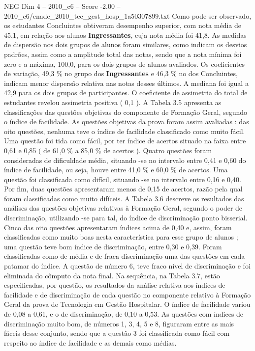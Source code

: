 \begin{textsample}{NEG Dim 4 – 2010\_c6 – Score -2.00 – 2010\_c6/enade\_2010\_tec\_gest\_hosp\_1a50307899.txt}
Como pode ser observado, os estudantes Concluintes obtiveram desempenho superior, com nota média de 45,1, em relação aos alunos \textbf{Ingressantes}, cuja nota média foi 41,8.
As medidas de dispersão nos dois grupos de alunos foram similares, como indicam os desvios padrões, assim como a amplitude total das notas, sendo que a nota mínima foi zero e a máxima, 100,0, para os dois grupos de alunos avaliados.
Os coeficientes de variação, 49,3 \% no grupo dos \textbf{Ingressantes} e 46,3 \% no dos Concluintes, indicam menor dispersão relativa nas notas desses últimos.
A mediana foi igual a 42,9 para os dois grupos de participantes.
O coeficiente de assimetria do total de estudantes revelou assimetria positiva ( 0,1 ).
A Tabela 3.5 apresenta as classificações das questões objetivas do componente de Formação Geral, segundo o índice de facilidade.
As questões objetivas da prova foram assim avaliadas : das oito questões, nenhuma teve o índice de facilidade classificado como muito fácil.
Uma questão foi tida como fácil, por ter índice de acertos situado na faixa entre 0,61 e 0,85 ( de 61,0 \% a 85,0 \% de acertos ).
Quatro questões foram consideradas de dificuldade média, situando -se no intervalo entre 0,41 e 0,60 do índice de facilidade, ou seja, houve entre 41,0 \% e 60,0 \% de acertos.
Uma questão foi classificada como difícil, situando -se no intervalo entre 0,16 e 0,40.
Por fim, duas questões apresentaram menos de 0,15 de acertos, razão pela qual foram classificadas como muito difíceis.
A Tabela 3.6 descreve os resultados das análises das questões objetivas relativas à Formação Geral, segundo o poder de discriminação, utilizando -se para tal, do índice de discriminação ponto bisserial.
Cinco das oito questões apresentaram índices acima de 0,40 e, assim, foram classificadas como muito boas nesta característica para esse grupo de alunos ; uma questão teve bom índice de discriminação, entre 0,30 e 0,39.
Foram classificadas como de média e de fraca discriminação uma das questões em cada patamar do índice.
A questão de número 6, teve fraco nível de discriminação e foi eliminada do cômputo da nota final.
Na sequência, na Tabela 3.7, estão especificadas, por questão, os resultados da análise relativa aos índices de facilidade e de discriminação de cada questão no componente relativo à Formação Geral da prova de Tecnologia em Gestão Hospitalar.
O índice de facilidade variou de 0,08 a 0,61, e o de discriminação, de 0,10 a 0,53.
As questões com índices de discriminação muito bom, de números 1, 3, 4, 5 e 8, figuraram entre as mais fáceis desse conjunto, sendo que a questão 3 foi classificada como fácil com respeito ao índice de facilidade e as demais como médias.

\end{textsample}
